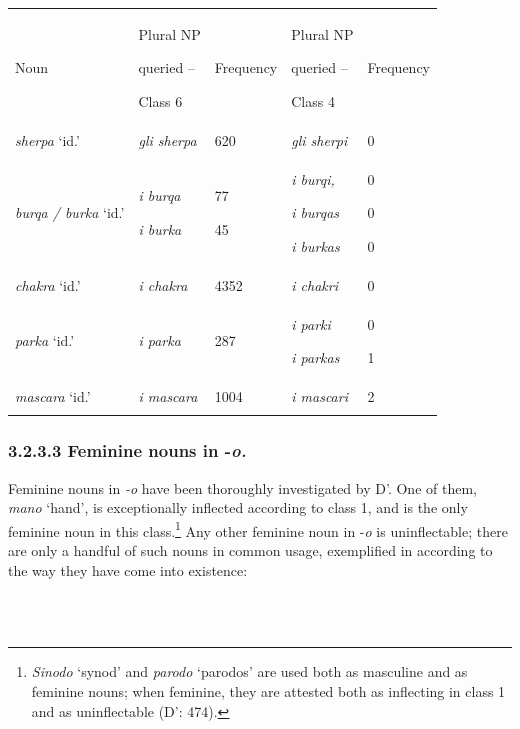 \documentclass[output=paper]{langscibook}
\begin{document}
\begin{tabularx}{\textwidth}{XXXXX}

\lsptoprule

Noun & Plural NP 

queried –

Class 6 & Frequency & Plural NP 

queried – 

Class 4 & Frequency\\
\textit{sherpa} ‘id.’ & \textit{gli sherpa} & 620 & \textit{gli sherpi} & 0\\
\textit{burqa / burka} ‘id.’ & \textit{i burqa}

\textit{i burka}  & 77

45 & \textit{i burqi,} 

\textit{i burqas}

\textit{i burkas} & 0

0

0\\
\textit{chakra} ‘id.’ & \textit{i chakra} & 4352 & \textit{i chakri} & 0\\
\textit{parka} ‘id.’ & \textit{i parka}  & 287 & \textit{i parki}

\textit{i parkas} & 0 

1\\
\textit{mascara} ‘id.’ & \textit{i mascara} & 1004 & \textit{i mascari}  & 2\\
\lspbottomrule
\end{tabularx}
\subsubsection{3.2.3.3  Feminine nouns in \nobreakdash-\textit{o.} }

Feminine nouns in \textit{\nobreakdash-o} have been thoroughly investigated by D’\citet{AchilleThornton2008}. One of them, \textit{mano} ‘hand’, is exceptionally inflected according to class 1, and is the only feminine noun in this class.\footnote{\textit{Sinodo} ‘synod’ and \textit{parodo} ‘parodos’ are used both as masculine and as feminine nouns; when feminine, they are attested both as inflecting in class 1 and as uninflectable (D’\citealt{AchilleThornton2008}: 474).} Any other feminine noun in \nobreakdash-\textit{o} is uninflectable; there are only a handful of such nouns in common usage, exemplified in  according to the way they have come into existence:

\ea%
    \label{ex:key:12}
    \gll \\
         \\
    \glt
    \z %
\end{document}

